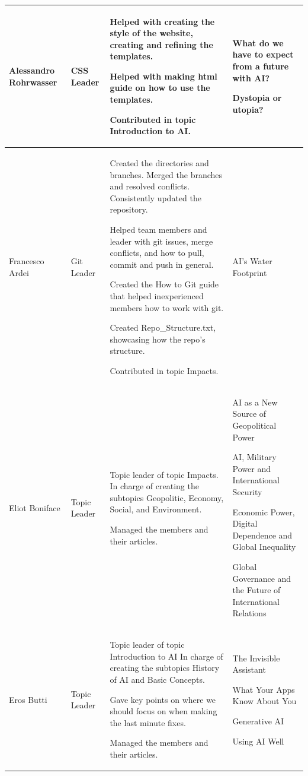 \documentclass[11pt]{article}
\begin{document}
\begin{longtable} [c] {|p{3cm}|l|p{7cm}|p{4cm}|}
	Alessandro Rohrwasser & CSS Leader &
	\par \textbullet{} Helped with creating the style of the website, creating and refining the templates.
	\par  \textbullet{} Helped with making html guide on how to use the templates.
	\par \textbullet{} Contributed in topic Introduction to AI. &
	\par \textbullet{} What do we have to expect from a future with AI?
	\par \textbullet{} Dystopia or utopia?\\ 
	\hline
	
	Francesco Ardei & Git Leader & 
	\par \textbullet{} Created the directories and branches. Merged the branches and resolved conflicts. Consistently updated the repository.
	\par \textbullet{} Helped team members and leader with git issues, merge conflicts, and how to pull, commit and push in general.
	\par \textbullet{} Created the How to Git guide that helped inexperienced members how to work with git.
	\par \textbullet{} Created Repo\_Structure.txt, showcasing how the repo's structure.
	\par \textbullet{} Contributed in topic Impacts. &
	AI’s Water Footprint\\ 
	\hline
	
	Eliot Boniface & Topic Leader &
	\par \textbullet{} Topic leader of topic Impacts. In charge of creating the subtopics Geopolitic, Economy, Social, and Environment.
	\par \textbullet{} Managed the members and their articles. &
	\par \textbullet{} AI as a New Source of Geopolitical Power
	\par \textbullet{} AI, Military Power and International Security
	\par \textbullet{} Economic Power, Digital Dependence and Global Inequality
	\par \textbullet{} Global Governance and the Future of International Relations\\ 
	\hline
	
	Eros Butti & Topic Leader &
	\par \textbullet{} Topic leader of topic Introduction to AI In charge of creating the subtopics History of AI and Basic Concepts.
	\par \textbullet{}  Gave key points on where we should focus on when making the last minute fixes.
	\par \textbullet{} Managed the members and their articles. &
	\par \textbullet{} The Invisible Assistant
	\par \textbullet{} What Your Apps Know About You
	\par \textbullet{} Generative AI
	\par \textbullet{} Using AI Well \\ 
	\hline
	

\end{longtable}
\end{document}
